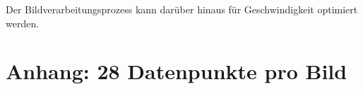 \documentclass[german,a4paper, 12pt]{llncs}
\begin{document}
Der Bildverarbeitungsprozess kann darüber hinaus für Geschwindigkeit optimiert werden.






\newpage

\nocite{*}


\appendix
\section{Anhang: 28 Datenpunkte pro Bild}
\label{appendix:datenpunkte}
\end{document}
